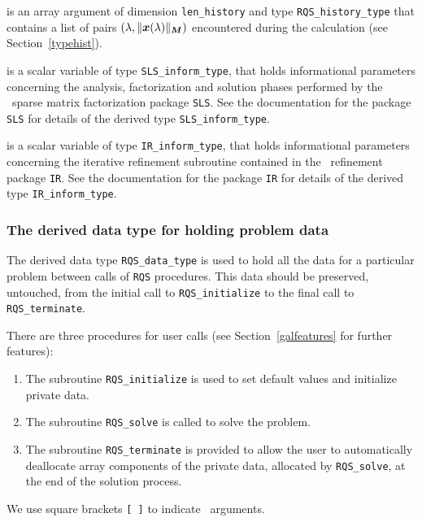 \documentclass{galahad}
\newcommand{\packagename}{RQS}
\begin{document}
\begin{description}
 is an array argument of dimension {\tt len\_history} and
type {\tt \packagename\_history\_type} that contains a list of pairs
$(\lambda,\|{\bm{x}}(\lambda)\|_{{\bm{M}}})$ encountered during the
calculation (see Section~\ref{typehist}).

 is a scalar variable of type {\tt SLS\_inform\_type},
that holds informational parameters concerning the analysis, factorization
and solution phases performed by
the \galahad\ sparse matrix factorization package {\tt SLS}.
See the documentation for the package {\tt SLS} for details of the
derived type {\tt SLS\_inform\_type}.

 is a scalar variable of type {\tt IR\_inform\_type},
that holds informational parameters concerning the iterative refinement
subroutine contained in the \galahad\ refinement package {\tt IR}.
See the documentation for the package {\tt IR} for details of the
derived type {\tt IR\_inform\_type}.


\end{description}


\subsubsection{The derived data type for holding problem data}\label{typedata}
The derived data type
{\tt \packagename\_data\_type}
is used to hold all the data for a particular problem between calls of
{\tt \packagename} procedures.
This data should be preserved, untouched, from the initial call to
{\tt \packagename\_initialize}
to the final call to
{\tt \packagename\_terminate}.


\galarguments
There are three procedures for user calls
(see Section~\ref{galfeatures} for further features):

\begin{enumerate}
\item The subroutine
      {\tt \packagename\_initialize}
      is used to set default values and initialize private data.
\item The subroutine
      {\tt \packagename\_solve}
      is called to solve the problem.
\item The subroutine
      {\tt \packagename\_terminate}
      is provided to allow the user to automatically deallocate array
       components of the private data, allocated by
       {\tt \packagename\_solve},
       at the end of the solution process.
\end{enumerate}
We use square brackets {\tt [ ]} to indicate \optional\ arguments.
\end{document}
